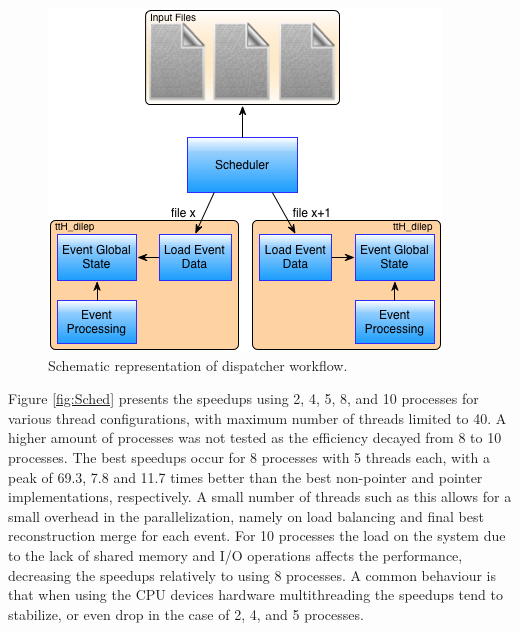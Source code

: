 \begin{figure}[!htp]
	\begin{center}
		\includegraphics[scale=0.5]{images/scheduler_workflow.png}
		\caption{Schematic representation of dispatcher workflow.}
		\label{fig:sched_flow}
	\end{center}
\end{figure}

Figure \ref{fig:Sched} presents the speedups using 2, 4, 5, 8, and 10 processes for various thread configurations, with maximum number of threads limited to 40. A higher amount of processes was not tested as the efficiency decayed from 8 to 10 processes. The best speedups occur for 8 processes with 5 threads each, with a peak of 69.3, 7.8 and 11.7 times better than the best non-pointer and pointer implementations, respectively. A small number of threads such as this allows for a small overhead in the \tth parallelization, namely on load balancing and final best reconstruction merge for each event. For 10 processes the load on the system due to the lack of shared memory and I/O operations affects the performance, decreasing the speedups relatively to using 8 processes. A common behaviour is that when using the CPU devices hardware multithreading the speedups tend to stabilize, or even drop in the case of 2, 4, and 5 processes.

